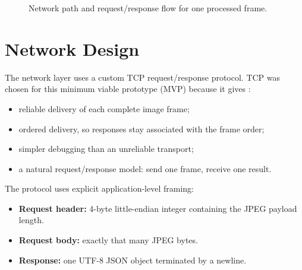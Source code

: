 \documentclass[11pt]{article}
\begin{document}
\begin{figure}[h]
\centering
{}
\caption{Network path and request/response flow for one processed frame.}
\end{figure}

\section{Network Design}

The network layer uses a custom TCP request/response protocol. TCP was chosen for this minimum viable prototype (MVP) because it gives \cite{rfc9293}:

\begin{itemize}
    \item reliable delivery of each complete image frame;
    \item ordered delivery, so responses stay associated with the frame order;
    \item simpler debugging than an unreliable transport;
    \item a natural request/response model: send one frame, receive one result.
\end{itemize}

The protocol uses explicit application-level framing:

\begin{itemize}
    \item \textbf{Request header:} 4-byte little-endian integer containing the JPEG payload length.
    \item \textbf{Request body:} exactly that many JPEG bytes.
    \item \textbf{Response:} one UTF-8 JSON object terminated by a newline.
\end{itemize}
\end{document}
